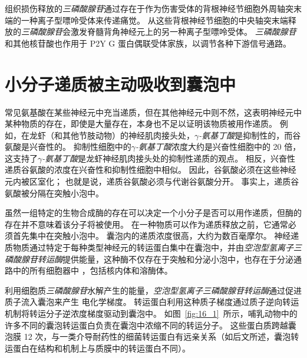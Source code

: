 组织损伤释放的\textit{三磷酸腺苷}通过存在于作为伤害受体的背根神经节细胞外周轴突末端的一种离子型嘌呤受体来传递痛觉。
从这些背根神经节细胞的中央轴突末端释放的\textit{三磷酸腺苷}会激发脊髓背角神经元上的另一种离子型嘌呤受体。
\textit{三磷酸腺苷}和其他核苷酸也作用于 P2Y G 蛋白偶联受体家族，以调节各种下游信号通路。



\section{小分子递质被主动吸收到囊泡中}

常见氨基酸在某些神经元中充当递质，但在其他神经元中则不然，这表明神经元中某种物质的存在，即使是大量存在，本身也不足以证明该物质被用作递质。
例如，在龙虾（和其他节肢动物）的神经肌肉接头处，\textit{$\gamma$-氨基丁酸}是抑制性的，而谷氨酸是兴奋性的。
抑制性细胞中的\textit{$\gamma$-氨基丁酸}浓度大约是兴奋性细胞中的 20 倍，这支持了\textit{$\gamma$-氨基丁酸}是龙虾神经肌肉接头处的抑制性递质的观点。
相反，兴奋性递质谷氨酸的浓度在兴奋性和抑制性细胞中相似。
因此，谷氨酸必须在这些神经元内被区室化；
也就是说，递质谷氨酸必须与代谢谷氨酸分开。
事实上，递质谷氨酸被分隔在突触小泡中。


虽然一组特定的生物合成酶的存在可以决定一个小分子是否可以用作递质，但酶的存在并不意味着该分子将被使用。
在一种物质可以作为递质释放之前，它通常必须首先集中在突触小泡中。
囊泡内的递质浓度很高，大约为数百毫摩尔。
神经递质物质通过特定于每种类型神经元的转运蛋白集中在囊泡中，并由\textit{空泡型氢离子三磷酸腺苷转运酶}提供能量，这种酶不仅存在于突触和分泌小泡中，也存在于分泌通路中的所有细胞器中 ，包括核内体和溶酶体。


利用细胞质\textit{三磷酸腺苷}水解产生的能量，\textit{空泡型氢离子三磷酸腺苷转运酶}通过促进质子流入囊泡来产生  电化学梯度。
转运蛋白利用这种质子梯度通过质子逆向转运机制将转运分子逆浓度梯度驱动到囊泡中。
如图~\ref{fig:16_1}~所示，哺乳动物中的许多不同的囊泡转运蛋白负责在囊泡中浓缩不同的转运分子。
这些蛋白质跨越囊泡膜 12 次，与一类介导耐药性的细菌转运蛋白有远亲关系（如后文所述，囊泡转运蛋白在结构和机制上与质膜中的转运蛋白不同）。


